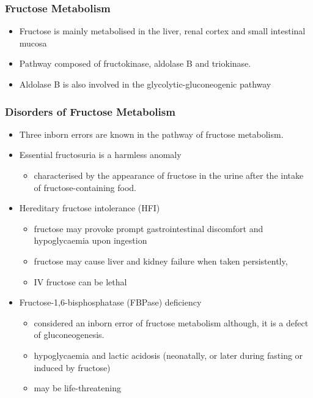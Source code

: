 \documentclass{scrartcl}
\begin{document}
\subsubsection{Fructose Metabolism}
\label{sec:org8591772}
\begin{itemize}
\item Fructose is mainly metabolised in the liver, renal cortex and small intestinal mucosa
\item Pathway composed of fructokinase, aldolase B and triokinase.
\item Aldolase B is also involved in the glycolytic-gluconeogenic pathway
\end{itemize}

\subsubsection{Disorders of Fructose Metabolism}
\label{sec:org6b0b39a}
\begin{itemize}
\item Three inborn errors are known in the pathway of fructose metabolism.
\item Essential fructosuria is a harmless anomaly
\begin{itemize}
\item characterised by the appearance of fructose in the urine after the intake of fructose-containing food.
\end{itemize}
\item Hereditary fructose intolerance (HFI)
\begin{itemize}
\item fructose may provoke prompt gastrointestinal discomfort and hypoglycaemia upon ingestion
\item fructose may cause liver and kidney failure when taken persistently,
\item IV fructose can be lethal
\end{itemize}
\item Fructose-1,6-bisphosphatase (FBPase) deficiency
\begin{itemize}
\item considered an inborn error of fructose metabolism although, it is a defect of gluconeogenesis.
\item hypoglycaemia and lactic acidosis (neonatally, or later during fasting or induced by fructose)
\item may be life-threatening
\end{itemize}
\end{itemize}
\end{document}
